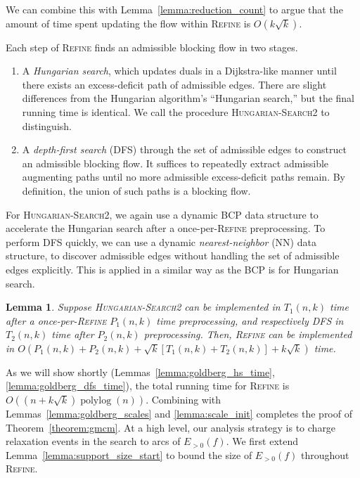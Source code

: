 \documentclass[11pt]{article}
\def\polylog{\mathop{\mathrm{polylog}}}
\theoremstyle{plain}
\newtheorem{lemma}{Lemma}[section]
\numberwithin{figure}{section}
\begin{document}
We can combine this with Lemma~\ref{lemma:reduction_count} to argue that the
amount of time spent updating the flow within \textsc{Refine} is
$O(k\sqrt{k})$.

Each step of \textsc{Refine} finds an admissible blocking flow in two stages.
\begin{enumerate}
\item A \emph{Hungarian search}, which updates duals in a Dijkstra-like
	manner until there exists an excess-deficit path of admissible edges.
	There are slight differences from the Hungarian algorithm's ``Hungarian
	search,'' but the final running time is identical.
	We call the procedure \textsc{Hungarian-Search2} to distinguish.

\item A \emph{depth-first search} (\textsc{DFS}) through the set of admissible
	edges to construct an admissible blocking flow.
	It suffices to repeatedly extract admissible augmenting paths until
	no more admissible excess-deficit paths remain.
	By definition, the union of such paths is a blocking flow.
\end{enumerate}
For \textsc{Hungarian-Search2}, we again use a dynamic BCP data structure to
accelerate the Hungarian search after a once-per-\textsc{Refine} preprocessing.
To perform \textsc{DFS} quickly, we can use a dynamic \emph{nearest-neighbor}
(NN) data structure, to discover admissible edges without handling the set of
admissible edges explicitly.
This is applied in a similar way as the BCP is for Hungarian search.

\begin{lemma}
Suppose \textsc{Hungarian-Search2} can be implemented in $T_1(n, k)$ time after
a once-per-\textsc{Refine} $P_1(n, k)$ time preprocessing, and respectively
\textsc{DFS} in $T_2(n, k)$ time after $P_2(n, k)$ preprocessing.
Then, \textsc{Refine} can be implemented in
$O(P_1(n, k) + P_2(n, k) + \sqrt{k}[T_1(n, k) + T_2(n, k)] + k\sqrt{k})$ time.
\end{lemma}

As we will show shortly (Lemmas~\ref{lemma:goldberg_hs_time},
\ref{lemma:goldberg_dfs_time}), the total running time for \textsc{Refine} is
$O((n + k\sqrt{k})\polylog(n))$.
Combining with Lemmas~\ref{lemma:goldberg_scales} and \ref{lemma:scale_init}
completes the proof of Theorem~\ref{theorem:gmcm}.
At a high level, our analysis strategy is to charge relaxation events in
the search to arcs of $E_{>0}(f)$.
We first extend Lemma~\ref{lemma:support_size_start} to bound the size of
$E_{>0}(f)$ throughout \textsc{Refine}.
\end{document}
